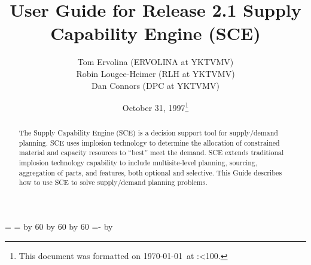 
\newcount\hh
\newcount\mm

\mm=\time
\hh=\time
\divide\hh by 60
\divide\mm by 60
\multiply\mm by 60
\mm=-\mm
\advance\mm by \time
\def\hhmm{\number\hh:\ifnum\mm<10{}0\fi\number\mm}


\title{User Guide for Release 2.1 Supply Capability Engine (SCE)}
\author{Tom Ervolina (ERVOLINA at YKTVMV)
\\Robin Lougee-Heimer (RLH at YKTVMV) \\ Dan Connors  (DPC at YKTVMV)}
\date{October 31, 1997\footnote{This document was 
formatted on \today\ at \hhmm.}}
\maketitle
\begin{abstract}
The Supply Capability Engine (SCE) is a decision support tool for
supply/demand planning.  SCE uses implosion technology to determine
the allocation of constrained material and capacity resources to
``best'' meet the demand.  SCE extends traditional implosion
technology capability to include multisite-level planning, sourcing,
aggregation of parts, and features, both optional and selective.  This
Guide describes how to use SCE to solve supply/demand planning
problems.
\end{abstract}

